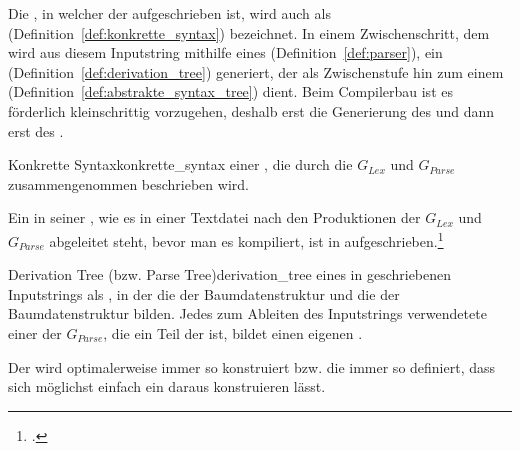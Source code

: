 
Die , in welcher der  aufgeschrieben ist, wird auch als  (Definition~\ref{def:konkrette_syntax}) bezeichnet. In einem Zwischenschritt, dem  wird aus diesem Inputstring mithilfe eines  (Definition~\ref{def:parser}), ein  (Definition~\ref{def:derivation_tree}) generiert, der als Zwischenstufe hin zum einem  (Definition~\ref{def:abstrakte_syntax_tree}) dient. Beim Compilerbau ist es förderlich kleinschrittig vorzugehen, deshalb erst die Generierung des  und dann erst des .

\begin{Definition}{Konkrette Syntax}{konkrette_syntax}
   einer , die durch die  $G_{Lex}$ und $G_{Parse}$ zusammengenommen beschrieben wird.

  Ein  in seiner , wie es in einer Textdatei nach den Produktionen der  $G_{Lex}$ und $G_{Parse}$ abgeleitet steht, bevor man es kompiliert, ist in  aufgeschrieben.\footcite{noauthor_course_2022}
\end{Definition}

\begin{Definition}{Derivation Tree (bzw. Parse Tree)}{derivation_tree}
   eines in  geschriebenen Inputstrings als , in der  die  der Baumdatenstruktur und  die  der Baumdatenstruktur bilden. Jedes zum Ableiten des Inputstrings verwendetete  einer  der  $G_{Parse}$, die ein Teil der  ist,  bildet einen eigenen .

  Der  wird optimalerweise immer so konstruiert bzw. die  immer so definiert, dass sich möglichst einfach ein  daraus konstruieren lässt.


\end{Definition}

